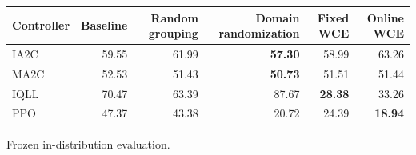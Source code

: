 \begin{tabular}{lrrrrr}
\hline
Controller & Baseline & Random grouping & Domain randomization & Fixed WCE & Online WCE \\
\hline
IA2C & 59.55 & 61.99 & \textbf{57.30} & 58.99 & 63.26 \\
MA2C & 52.53 & 51.43 & \textbf{50.73} & 51.51 & 51.44 \\
IQLL & 70.47 & 63.39 & 87.67 & \textbf{28.38} & 33.26 \\
PPO & 47.37 & 43.38 & 20.72 & 24.39 & \textbf{18.94} \\
\hline
\end{tabular}
Frozen in-distribution evaluation.

